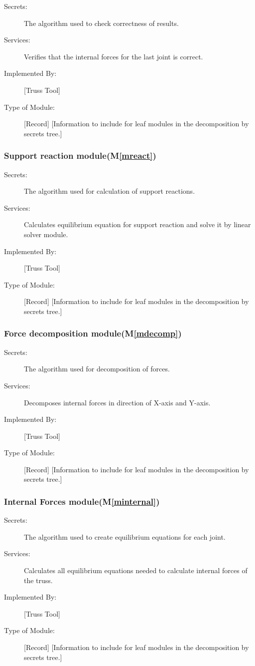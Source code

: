 \documentclass[12pt, titlepage]{article}
\newcommand{\mref}[1]{M\ref{#1}}
\begin{document}
\begin{description}
\item[Secrets:]The algorithm used to check correctness of results.
\item[Services:] Verifies that the internal forces for the last joint is correct.
\item[Implemented By:] [Truss Tool]
\item[Type of Module:] [Record]
  [Information to include for leaf modules in the decomposition by secrets tree.]
\end{description}
\subsubsection{Support reaction module(\mref{mreact})}

\begin{description}
\item[Secrets:]The algorithm used for calculation of support reactions.
\item[Services:] Calculates equilibrium equation for support reaction and solve it by linear solver module.
\item[Implemented By:] [Truss Tool]
\item[Type of Module:] [Record]
  [Information to include for leaf modules in the decomposition by secrets tree.]
\end{description}
\subsubsection{Force decomposition module(\mref{mdecomp})}

\begin{description}
\item[Secrets:]The algorithm used for decomposition of forces.
\item[Services:] Decomposes internal forces in direction of X-axis and Y-axis.
\item[Implemented By:] [Truss Tool]
\item[Type of Module:] [Record]
  [Information to include for leaf modules in the decomposition by secrets tree.]
\end{description}
\subsubsection{Internal Forces module(\mref{minternal})}

\begin{description}
\item[Secrets:]The algorithm used to create equilibrium equations for each joint.
\item[Services:] Calculates all equilibrium equations needed to calculate internal forces of the truss. 
\item[Implemented By:] [Truss Tool]
\item[Type of Module:] [Record]
  [Information to include for leaf modules in the decomposition by secrets tree.]
\end{description}
\end{document}
